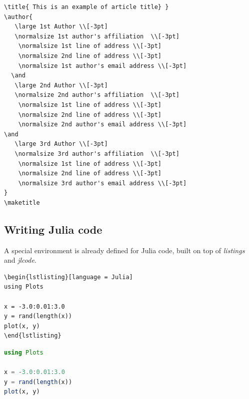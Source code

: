 \documentclass{juliacon}
\begin{document}
\begin{verbatim}
\title{ This is an example of article title} }
\author{
   \large 1st Author \\[-3pt]
   \normalsize 1st author's affiliation  \\[-3pt]
    \normalsize 1st line of address \\[-3pt]
    \normalsize 2nd line of address \\[-3pt]
    \normalsize	1st author's email address \\[-3pt]
  \and
   \large 2nd Author \\[-3pt]
   \normalsize 2nd author's affiliation  \\[-3pt]
    \normalsize 1st line of address \\[-3pt]
    \normalsize 2nd line of address \\[-3pt]
    \normalsize	2nd author's email address \\[-3pt]
\and
   \large 3rd Author \\[-3pt]
   \normalsize 3rd author's affiliation  \\[-3pt]
    \normalsize 1st line of address \\[-3pt]
    \normalsize 2nd line of address \\[-3pt]
    \normalsize	3rd author's email address \\[-3pt]
}
\maketitle
\end{verbatim}

\subsection{Writing Julia code}

A special environment is already defined for Julia code,
built on top of \textit{listings} and \textit{jlcode}.

\begin{verbatim}
\begin{lstlisting}[language = Julia]
using Plots

x = -3.0:0.01:3.0
y = rand(length(x))
plot(x, y)
\end{lstlisting}
\end{verbatim}
\begin{lstlisting}[language = Julia]
using Plots

x = -3.0:0.01:3.0
y = rand(length(x))
plot(x, y)
\end{lstlisting}
\end{document}
